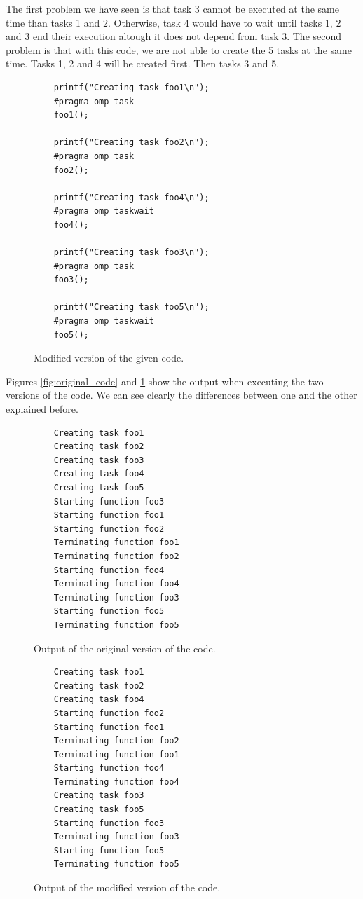 \documentclass[12pt, a4paper]{article}
\begin{document}
The first problem we have seen is that task 3 cannot be executed at the same time than tasks 1 and 2. Otherwise, task 4 would have to wait until tasks 1, 2 and 3 end their execution altough it does not depend from task 3. The second problem is that with this code, we are not able to create the 5 tasks at the same time. Tasks 1, 2 and 4 will be created first. Then tasks 3 and 5.

\begin{figure}[H]
	\begin{lstlisting}
	printf("Creating task foo1\n");
	#pragma omp task
	foo1();
	
	printf("Creating task foo2\n");
	#pragma omp task
	foo2();
	
	printf("Creating task foo4\n");
	#pragma omp taskwait
	foo4();

	printf("Creating task foo3\n");
	#pragma omp task
	foo3();
	
	printf("Creating task foo5\n");
	#pragma omp taskwait
	foo5();
	\end{lstlisting}
	
	\caption{Modified version of the given code.}
\end{figure}

Figures \ref{fig:original_code} and \ref{fig:modified_code} show the output when executing the two versions of the code. We can see clearly the differences between one and the other explained before.

\begin{figure}[H]
\begin{minipage}[b]{0.47\linewidth}

\begin{lstlisting}
	Creating task foo1
	Creating task foo2
	Creating task foo3
	Creating task foo4
	Creating task foo5
	Starting function foo3
	Starting function foo1
	Starting function foo2
	Terminating function foo1
	Terminating function foo2
	Starting function foo4
	Terminating function foo4
	Terminating function foo3
	Starting function foo5
	Terminating function foo5
\end{lstlisting}

\caption{Output of the original version of the code.}
\label{fig:original_code}
\end{minipage}
\hspace{0.5cm}
\begin{minipage}[b]{0.48\linewidth}

\begin{lstlisting}
	Creating task foo1
	Creating task foo2
	Creating task foo4
	Starting function foo2
	Starting function foo1
	Terminating function foo2
	Terminating function foo1
	Starting function foo4
	Terminating function foo4
	Creating task foo3
	Creating task foo5
	Starting function foo3
	Terminating function foo3
	Starting function foo5
	Terminating function foo5
\end{lstlisting}

\caption{Output of the modified version of the code.}
\label{fig:modified_code}
\end{minipage}
\end{figure}
\end{document}
